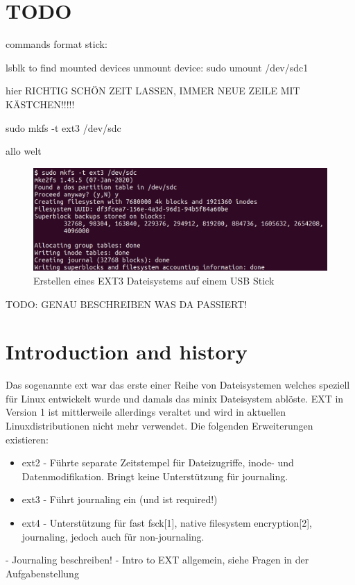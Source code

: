 \section{TODO}

commands format stick:

lsblk to find mounted devices
unmount device:  sudo umount /dev/sdc1

hier RICHTIG SCHÖN ZEIT LASSEN, IMMER NEUE ZEILE MIT KÄSTCHEN!!!!!

 sudo mkfs -t ext3 /dev/sdc

allo \cite{Sciencedirect.07.01.2022}  welt

\begin{figure}[H]
	\centering
	\includegraphics[width=12cm,keepaspectratio=true]{pictures/createfs.png}
	\caption{
		Erstellen eines EXT3 Dateisystems auf einem USB Stick
	}
	\label{fig:createfs}
\end{figure}

TODO: GENAU BESCHREIBEN WAS DA PASSIERT!

\section{Introduction and history}

Das sogenannte \ac{ext} war das erste einer Reihe von Dateisystemen welches speziell für Linux entwickelt wurde und damals das minix Dateisystem ablöste. EXT in Version 1 ist mittlerweile allerdings veraltet und wird in aktuellen Linuxdistributionen nicht mehr verwendet. Die folgenden Erweiterungen existieren:

\begin{itemize}
	\item ext2 - Führte separate Zeitstempel für Dateizugriffe, inode- und Datenmodifikation. Bringt keine Unterstützung für journaling.
	\item ext3 - Führt journaling ein (und ist required!)
	\item ext4 - Unterstützung für fast fsck[1], native filesystem encryption[2], journaling, jedoch auch für non-journaling.
\end{itemize}

- Journaling beschreiben!
- Intro to EXT allgemein, siehe Fragen in der Aufgabenstellung


